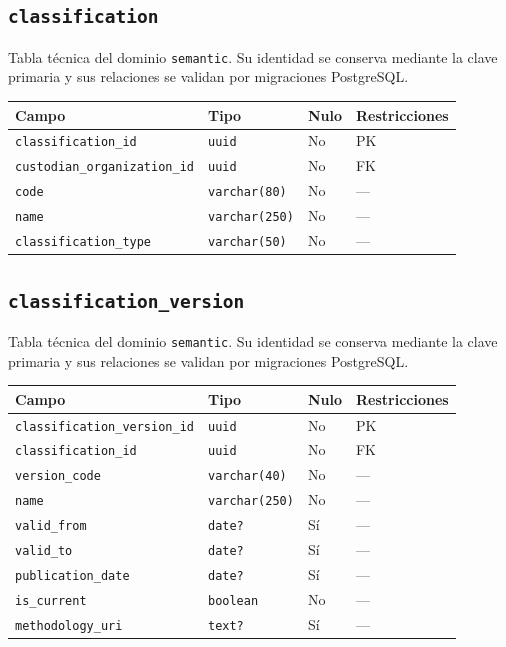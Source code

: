 \documentclass[11pt]{article}
\begin{document}
\subsection{\texttt{classification}}
Tabla técnica del dominio \texttt{semantic}. Su identidad se conserva mediante la clave primaria y sus relaciones se validan por migraciones PostgreSQL.
\begin{longtable}{>{\raggedright\arraybackslash}p{} p{} p{} p{}}
\toprule Campo & Tipo & Nulo & Restricciones \\ \midrule\endhead
\texttt{classification\_id} & \texttt{uuid} & No & PK \\
\texttt{custodian\_organization\_id} & \texttt{uuid} & No & FK \\
\texttt{code} & \texttt{varchar(80)} & No & --- \\
\texttt{name} & \texttt{varchar(250)} & No & --- \\
\texttt{classification\_type} & \texttt{varchar(50)} & No & --- \\
\bottomrule\end{longtable}
\subsection{\texttt{classification\_version}}
Tabla técnica del dominio \texttt{semantic}. Su identidad se conserva mediante la clave primaria y sus relaciones se validan por migraciones PostgreSQL.
\begin{longtable}{>{\raggedright\arraybackslash}p{} p{} p{} p{}}
\toprule Campo & Tipo & Nulo & Restricciones \\ \midrule\endhead
\texttt{classification\_version\_id} & \texttt{uuid} & No & PK \\
\texttt{classification\_id} & \texttt{uuid} & No & FK \\
\texttt{version\_code} & \texttt{varchar(40)} & No & --- \\
\texttt{name} & \texttt{varchar(250)} & No & --- \\
\texttt{valid\_from} & \texttt{date?} & Sí & --- \\
\texttt{valid\_to} & \texttt{date?} & Sí & --- \\
\texttt{publication\_date} & \texttt{date?} & Sí & --- \\
\texttt{is\_current} & \texttt{boolean} & No & --- \\
\texttt{methodology\_uri} & \texttt{text?} & Sí & --- \\
\bottomrule\end{longtable}
\end{document}
